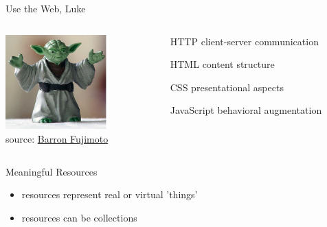 \documentclass{beamer}
\begin{document}
\begin{frame}{Use the Web, Luke}
  \begin{columns}
    \begin{column}{4.0cm}
      \includegraphics[width=4cm]{images/yoda.png}
      \\
      \tiny source: \href{http://www.flickr.com/photos/barron/15483113/}{Barron Fujimoto}
    \end{column}

    \begin{column}{5.5cm}
      \begin{itemize}
        \item[HTTP] client-server communication
        \item[HTML] content structure
        \item[CSS] presentational aspects
        \item[JavaScript] behavioral augmentation
      \end{itemize}
    \end{column}
  \end{columns}
\end{frame}

\begin{frame}{Meaningful Resources}
  \begin{itemize}
    \item resources represent real or virtual 'things'
    \item resources can be collections
  \end{itemize}
\end{frame}
\end{document}
